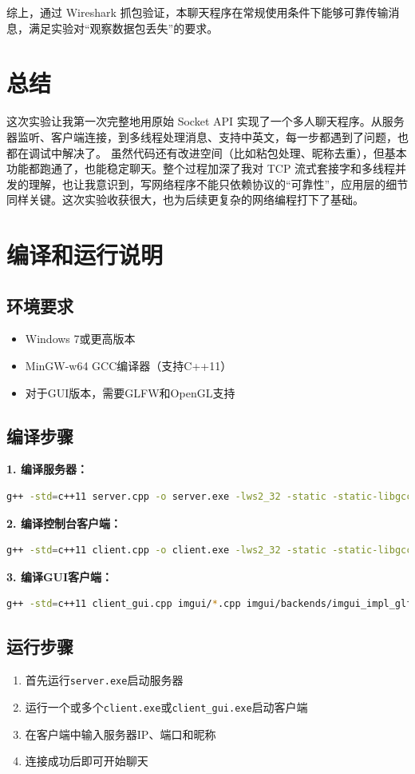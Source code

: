 \documentclass[12pt, a4paper]{article}
\newcommand{\cmd}[1]{\texttt{#1}}
\begin{document}
综上，通过 Wireshark 抓包验证，本聊天程序在常规使用条件下能够可靠传输消息，满足实验对“观察数据包丢失”的要求。


\section{总结}

这次实验让我第一次完整地用原始 Socket API 实现了一个多人聊天程序。从服务器监听、客户端连接，到多线程处理消息、支持中英文，每一步都遇到了问题，也都在调试中解决了。
虽然代码还有改进空间（比如粘包处理、昵称去重），但基本功能都跑通了，也能稳定聊天。整个过程加深了我对 TCP 流式套接字和多线程并发的理解，也让我意识到，写网络程序不能只依赖协议的“可靠性”，应用层的细节同样关键。这次实验收获很大，也为后续更复杂的网络编程打下了基础。
\section*{编译和运行说明}

\subsection*{环境要求}

\begin{itemize}[itemsep=3pt]
  \item Windows 7或更高版本
  \item MinGW-w64 GCC编译器（支持C++11）
  \item 对于GUI版本，需要GLFW和OpenGL支持
\end{itemize}

\subsection*{编译步骤}

\textbf{1. 编译服务器：}
\begin{lstlisting}[language=bash]
g++ -std=c++11 server.cpp -o server.exe -lws2_32 -static -static-libgcc -static-libstdc++
\end{lstlisting}

\textbf{2. 编译控制台客户端：}
\begin{lstlisting}[language=bash]
g++ -std=c++11 client.cpp -o client.exe -lws2_32 -static -static-libgcc -static-libstdc++
\end{lstlisting}

\textbf{3. 编译GUI客户端：}
\begin{lstlisting}[language=bash]
g++ -std=c++11 client_gui.cpp imgui/*.cpp imgui/backends/imgui_impl_glfw.cpp imgui/backends/imgui_impl_opengl3.cpp -o client_gui.exe -I./imgui -I./imgui/backends -lglfw3 -lopengl32 -lgdi32 -lws2_32 -static -static-libgcc -static-libstdc++
\end{lstlisting}

\subsection*{运行步骤}

\begin{enumerate}[itemsep=3pt]
  \item 首先运行\cmd{server.exe}启动服务器
  \item 运行一个或多个\cmd{client.exe}或\cmd{client\_gui.exe}启动客户端
  \item 在客户端中输入服务器IP、端口和昵称
  \item 连接成功后即可开始聊天
\end{enumerate}
\end{document}
